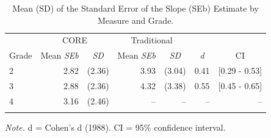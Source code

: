 \documentclass[
  english,
  man, fleqn, noextraspace]{apa6}
\begin{document}
\begin{table}[tbp]

\begin{center}
\begin{threeparttable}

\caption{\label{tab:tbl-seb-results}Mean (SD) of the Standard Error of the Slope (SEb) Estimate by Measure and Grade.}

\begin{tabular}{lrrrrrr}
\toprule
 & \multicolumn{2}{c}{CORE} & \multicolumn{2}{c}{Traditional}  &  &\\
\cmidrule(r){2-3} \cmidrule(r){4-5}
Grade & \multicolumn{1}{c}{Mean \emph{SEb}} & \multicolumn{1}{c}{\emph{SD}} & \multicolumn{1}{c}{Mean \emph{SEb}} & \multicolumn{1}{c}{\emph{SD}} & \multicolumn{1}{c}{\emph{d}} & \multicolumn{1}{c}{CI}\\
\midrule
2 & 2.82 & (2.36) & 3.93 & (3.04) & 0.41 & {}[0.29 - 0.53]\\
3 & 2.88 & (2.36) & 4.32 & (3.38) & 0.55 & {}[0.45 - 0.65]\\
4 & 3.16 & (2.46) & -- & -- & -- & --\\
\bottomrule
\addlinespace
\end{tabular}

\begin{tablenotes}[para]
\normalsize{\textit{Note.} d = Cohen's d (1988). CI = 95\% confidence interval.}
\end{tablenotes}

\end{threeparttable}
\end{center}

\end{table}
\end{document}
